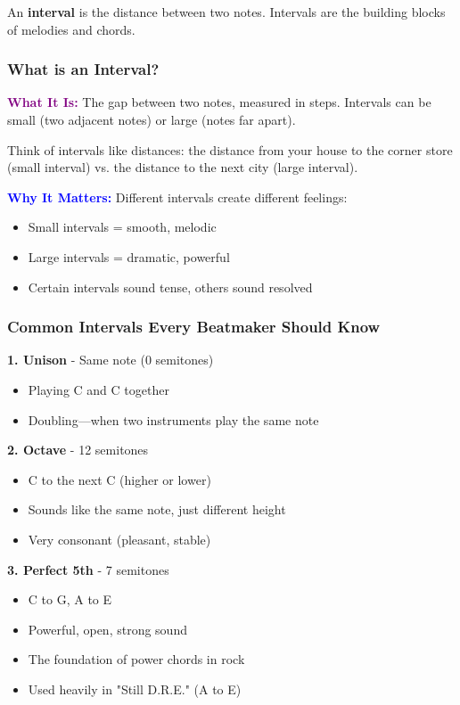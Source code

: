 \documentclass[11pt,letterpaper]{article}
\newcommand{\purple}[1]{\textcolor{purple}{\textbf{#1}}}
\newcommand{\bluepurple}[1]{\textcolor{blue}{\textbf{#1}}}
\begin{document}
An \textbf{interval} is the distance between two notes. Intervals are the building blocks of melodies and chords.

\subsubsection{What is an Interval?}

\textbf{\purple{What It Is:}} The gap between two notes, measured in steps. Intervals can be small (two adjacent notes) or large (notes far apart).

Think of intervals like distances: the distance from your house to the corner store (small interval) vs. the distance to the next city (large interval).

\textbf{\bluepurple{Why It Matters:}} Different intervals create different feelings:
\begin{itemize}[leftmargin=*]
\item Small intervals = smooth, melodic
\item Large intervals = dramatic, powerful
\item Certain intervals sound tense, others sound resolved
\end{itemize}

\subsubsection{Common Intervals Every Beatmaker Should Know}

\textbf{1. Unison} - Same note (0 semitones)
\begin{itemize}[leftmargin=*]
\item Playing C and C together
\item Doubling—when two instruments play the same note
\end{itemize}

\textbf{2. Octave} - 12 semitones
\begin{itemize}[leftmargin=*]
\item C to the next C (higher or lower)
\item Sounds like the same note, just different height
\item Very consonant (pleasant, stable)
\end{itemize}

\textbf{3. Perfect 5th} - 7 semitones
\begin{itemize}[leftmargin=*]
\item C to G, A to E
\item Powerful, open, strong sound
\item The foundation of power chords in rock
\item Used heavily in "Still D.R.E." (A to E)
\end{itemize}
\end{document}
